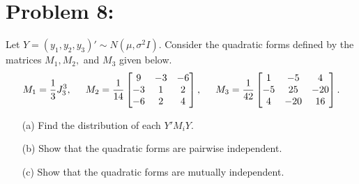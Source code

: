 \documentclass[11pt]{article}
\begin{document}
\section*{Problem 8:}
Let $Y = (y_1,y_2,y_3)' \sim N(\mu,\sigma^2I)$.  Consider the quadratic forms defined by the matrices $M_1,M_2,$ and $M_3$ given below.
\[
M_1 = \frac{1}{3}J_3^3, \hspace{5mm}M_2 = \frac{1}{14}\begin{bmatrix}
9 & -3 & -6 \\
-3 & 1 & 2 \\
-6 & 2 & 4
\end{bmatrix}, \hspace{5mm}M_3 = \frac{1}{42}\begin{bmatrix}
1 & -5 & 4 \\
-5 & 25 & -20 \\
4 & -20 & 16
\end{bmatrix}.
\]
\begin{itemize}
\item[(a)] Find the distribution of each $Y'M_iY$.
\item[(b)] Show that the quadratic forms are pairwise independent.
\item[(c)] Show that the quadratic forms are mutually independent.
\end{itemize}
\end{document}

